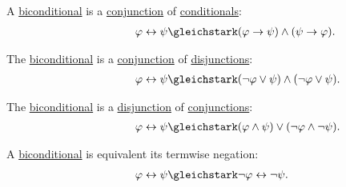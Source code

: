 \begin{proposition}
\begin{thmenum}
     A \hyperref[def:propositional_language/connectives/biconditional]{biconditional} is a \hyperref[def:propositional_language/connectives/conjunction]{conjunction} of \hyperref[def:propositional_language/connectives]{conditionals}:
    \begin{equation}\label{eq:thm:boolean_equivalences/biconditional_via_conditionals}
      \begin{split}
        \mathllap{\varphi \leftrightarrow \psi} &\gleichstark \mathrlap{(\varphi \rightarrow \psi) \wedge (\psi \rightarrow \varphi).}
      \end{split}
    \end{equation}

     The \hyperref[def:propositional_language/connectives/biconditional]{biconditional} is a \hyperref[def:propositional_language/connectives/disjunction]{conjunction} of \hyperref[def:propositional_language/connectives/conjunction]{disjunctions}:
    \begin{equation}\label{eq:thm:boolean_equivalences/biconditional_as_conjunction}
      \begin{split}
        \mathllap{\varphi \leftrightarrow \psi} &\gleichstark \mathrlap{(\neg \varphi \vee \psi) \wedge (\neg \varphi \vee \psi).}
      \end{split}
    \end{equation}

     The \hyperref[def:propositional_language/connectives/biconditional]{biconditional} is a \hyperref[def:propositional_language/connectives/disjunction]{disjunction} of \hyperref[def:propositional_language/connectives/conjunction]{conjunctions}:
    \begin{equation}\label{eq:thm:boolean_equivalences/biconditional_as_disjunction}
      \begin{split}
        \mathllap{\varphi \leftrightarrow \psi} &\gleichstark \mathrlap{(\varphi \wedge \psi) \vee (\neg \varphi \wedge \neg \psi).}
      \end{split}
    \end{equation}

     A \hyperref[def:propositional_language/connectives/biconditional]{biconditional} is equivalent its termwise negation:
    \begin{equation}\label{eq:thm:boolean_equivalences/biconditional_member_negation}
      \begin{split}
        \mathllap{\varphi \leftrightarrow \psi} &\gleichstark \mathrlap{\neg \varphi \leftrightarrow \neg \psi.}
      \end{split}
    \end{equation}


\end{thmenum}
\end{proposition}
